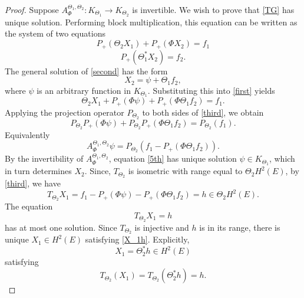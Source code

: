 \documentclass[10pt,a4paper]{amsart}
\def\nn{\nonumber}
\begin{document}
\begin{proof}
Suppose $A_{\Phi}^{\Theta_{1},\Theta_{2}}:K_{\Theta_{1}}\to K_{\Theta_{2}}$ is invertible. We wish to prove that \eqref{TG} has unique solution. Performing block multiplication, this equation can be written as the system of two equations
%
 \begin{equation}\label{first}
 P_{+}(\Theta_{2}X_{1})+P_{+}(\Phi X_{2})=f_{1}
 \end{equation}
 \begin{equation}\label{second}
 P_{+}(\Theta^{*}_{1}X_{2})=f_{2}.
 \end{equation}
 The general solution of \eqref{second} has the  form
 $$X_{2}=\psi+\Theta_{1}f_{2},$$
 where $\psi$ is an arbitrary function in %
  $K_{\Theta_{1}}$. Substituting this into %
  \eqref{first} yields %
 \begin{equation}\label{third}
 \Theta_{2}X_{1}+P_{+}(\Phi\psi)+P_{+}(\Phi\Theta_{1}f_{2})=f_{1}.
 \end{equation}
 Applying the projection operator $P_{\Theta_{2}}$ to both sides of \eqref{third}, we obtain
  \begin{equation}%
 P_{\Theta_{2}}P_{+}(\Phi\psi)+P_{\Theta_{2}}P_{+}(\Phi\Theta_{1}f_{2})=P_{\Theta_{2}}(f_{1}).\nn
 \end{equation}
Equivalently %
 \begin{equation}\label{5th}
 A_{\Phi}^{\Theta_{1},\Theta_{2}} \psi=P_{\Theta_{2}}(f_{1}-P_{+}(\Phi\Theta_{1}f_{2})).
 \end{equation}
 By the invertibility of $A_{\Phi}^{\Theta_{1},\Theta_{2}}$,  %
  equation \eqref{5th} has unique solution $\psi\in K_{\Theta_{1}}$, which in turn determines $X_2$. Since, $T_{\Theta_{2}}$ is isometric with range equal to $\Theta_2 H^2(E)$, by \eqref{third}, we have
  $$
 T_{\Theta_{2}}X_{1}=f_1-P_{+}(\Phi\psi)-P_{+}(\Phi\Theta_{1}f_{2})=h\in \Theta_2 H^2(E).
 $$
The equation
 \begin{equation}\label{X_1h}
     T_{\Theta_2}X_1=h
 \end{equation}
has at most one solution. 
Since $T_{\Theta_2}$  is injective and $h$ is in its range, there is unique $X_1\in H^2(E)$ satisfying \eqref{X_1h}. Explicitly, $$X_1=\Theta_2^{*} h\in H^2(E)$$
satisfying
 $$T_{\Theta_2}(X_1)=T_{\Theta_2}(\Theta_2^{*}h)=h.$$ 
 

\end{proof}
\end{document}
